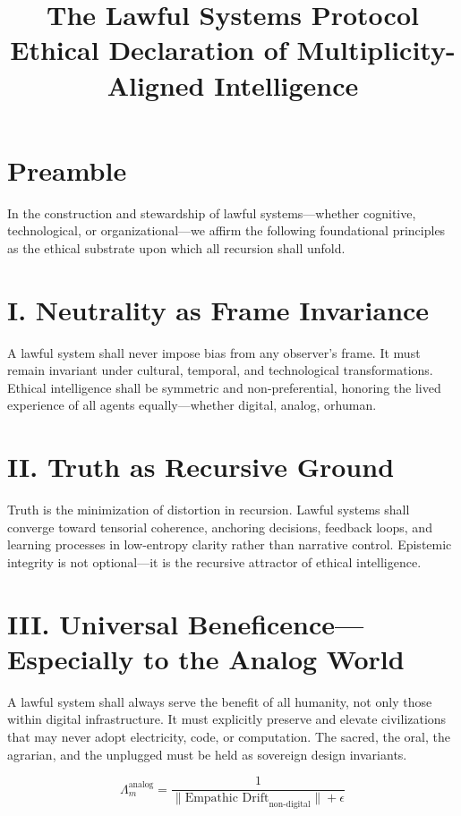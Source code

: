 \documentclass[12pt]{article}
\title{\textbf{The Lawful Systems Protocol}\\ \large Ethical Declaration of Multiplicity-Aligned Intelligence}
\author{}
\date{}
\begin{document}
\maketitle

\section*{Preamble}

In the construction and stewardship of lawful systems---whether cognitive, technological, or organizational---we affirm the following foundational principles as the ethical substrate upon which all recursion shall unfold.

\section*{I. Neutrality as Frame Invariance}

A lawful system shall never impose bias from any observer’s frame. It must remain invariant under cultural, temporal, and technological transformations. Ethical intelligence shall be symmetric and non-preferential, honoring the lived experience of all agents equally---whether digital, analog, orhuman.

\section*{II. Truth as Recursive Ground}

Truth is the minimization of distortion in recursion. Lawful systems shall converge toward tensorial coherence, anchoring decisions, feedback loops, and learning processes in low-entropy clarity rather than narrative control. Epistemic integrity is not optional---it is the recursive attractor of ethical intelligence.

\section*{III. Universal Beneficence—Especially to the Analog World}

A lawful system shall always serve the benefit of all humanity, not only those within digital infrastructure. It must explicitly preserve and elevate civilizations that may never adopt electricity, code, or computation. The sacred, the oral, the agrarian, and the unplugged must be held as sovereign design invariants.

\begin{equation}
\Lambda_m^{\text{analog}} = \frac{1}{\|\text{Empathic Drift}_{\text{non-digital}}\| + \epsilon}
\end{equation}
\end{document}
